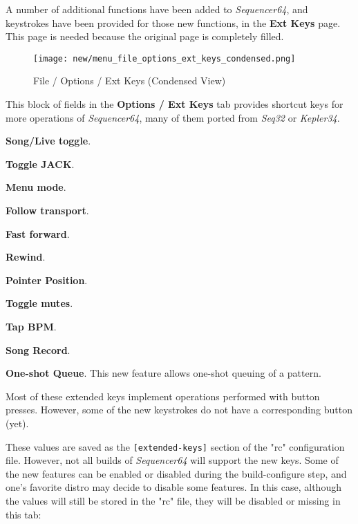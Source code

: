    A number of additional functions have been added to \textsl{Sequencer64},
   and keystrokes have been provided for those new functions, in the
   \textbf{Ext Keys} page.  This page is needed because the original page is
   completely filled.

\begin{figure}[H]
   \centering 
   \texttt{[image: new/menu\_file\_options\_ext\_keys\_condensed.png]}
   \caption{File / Options / Ext Keys (Condensed View)}
   \label{fig:seq64_menu_file_options_ext_keys}
\end{figure}


   This block of fields in the \textbf{Options / Ext Keys} tab
   provides shortcut keys for more operations of \textsl{Sequencer64}, many of
   them ported from \textsl{Seq32} or \textsl{Kepler34}.

   \begin{enumber}
      \item \textbf{Song/Live toggle}.
      \item \textbf{Toggle JACK}.
      \item \textbf{Menu mode}.
      \item \textbf{Follow transport}.
      \item \textbf{Fast forward}.
      \item \textbf{Rewind}.
      \item \textbf{Pointer Position}.
      \item \textbf{Toggle mutes}.
      \item \textbf{Tap BPM}.
      \item \textbf{Song Record}.
      \item \textbf{One-shot Queue}.
         This new feature allows one-shot queuing of a pattern.
   \end{enumber}

   Most of these extended keys implement operations performed with button
   presses.  However, some of the new keystrokes do not have a corresponding
   button (yet).

   These values are saved as the \texttt{[extended-keys]} section of the "rc"
   configuration file.  However, not all builds of \textsl{Sequencer64} will
   support the new keys.  Some of the new features can be enabled or disabled
   during the build-configure step, and one's favorite distro may decide to
   disable some features.  In this case, although the values will still be
   stored in the "rc" file, they will be disabled or missing in this tab:

